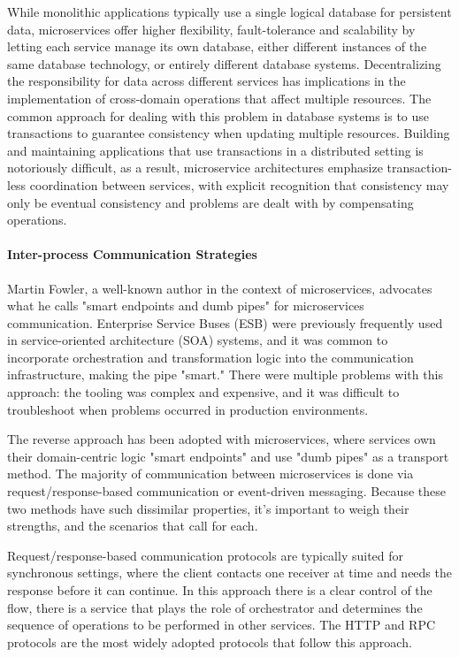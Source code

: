 While monolithic applications typically use a single logical database for persistent data,
microservices offer higher flexibility, fault-tolerance and scalability by letting each service manage its own database, either different instances of the same database technology,
or entirely different database systems.
Decentralizing the responsibility for data across different services has implications in the implementation of cross-domain operations that affect multiple resources.
The common approach for dealing with this problem in database systems is to use transactions to guarantee consistency when updating multiple resources.
Building and maintaining applications that use transactions in a distributed setting is notoriously difficult,
as a result, microservice architectures emphasize transaction-less coordination between services,
with explicit recognition that consistency may only be eventual consistency and problems are dealt with by compensating operations.


\paragraph{Inter-process Communication Strategies}

Martin Fowler, a well-known author in the context of microservices, advocates what he calls "smart endpoints and dumb pipes" for microservices communication.
Enterprise Service Buses (ESB) were previously frequently used in service-oriented architecture (SOA) systems,
and it was common to incorporate orchestration and transformation logic into the communication infrastructure,
making the pipe "smart." There were multiple problems with this approach:
the tooling was complex and expensive, and it was difficult to troubleshoot when problems occurred in production environments.

The reverse approach has been adopted with microservices,
where services own their domain-centric logic "smart endpoints" and use "dumb pipes" as a transport method.
The majority of communication between microservices is done via request/response-based communication or event-driven messaging.
Because these two methods have such dissimilar properties, it's important to weigh their strengths, and the scenarios that call for each.

Request/response-based communication protocols are typically suited for synchronous settings,
where the client contacts one receiver at time and needs the response before it can continue.
In this approach there is a clear control of the flow,
there is a service that plays the role of orchestrator and determines the sequence of operations to be performed in other services.
The HTTP and RPC protocols are the most widely adopted protocols that follow this approach.

